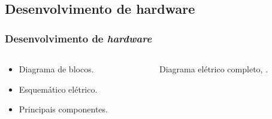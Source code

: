 \documentclass[hyperref={colorlinks=true,    
allcolors = blue,citecolor=blue}]{beamer} %
\begin{document}
\begin{frame}
\subsection{Desenvolvimento de hardware}
\frametitle{Desenvolvimento de \textit{hardware}}


\begin{columns}
    \begin{column}{0.47\textwidth}
        \begin{itemize}
            \item Diagrama de blocos.
            \item Esquemático elétrico.
            \item Principais componentes.
        \end{itemize}
    \end{column}
    \begin{column}{0.5\textwidth}
        \begin{figure}
            \centering            
        \caption{Diagrama elétrico completo, \cite{tinati}.}
        \label{fig:enter-label}
        \end{figure}
    \end{column}
\end{columns}

\end{frame}
\end{document}

